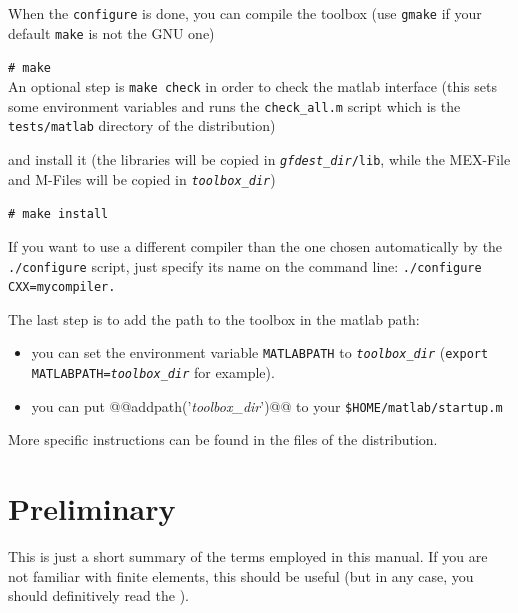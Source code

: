 When the \texttt{configure} is done, you can compile the toolbox (use \texttt{gmake} if your default
\texttt{make} is not the GNU one)

\verb+# make+\\[1mm]

An optional step is \texttt{make check} in order to check the matlab interface (this sets some environment variables and runs the \texttt{check_all.m} script which is the \texttt{tests/matlab} directory of the distribution)

and install it (the libraries will be copied in \texttt{\textit{gfdest_dir}/lib}, while the MEX-File and M-Files 
will be copied in \texttt{\textit{toolbox_dir}})

\verb+# make install+


If you want to use a different compiler than the one chosen
automatically by the \texttt{./configure} script, just specify its
name on the command line: \texttt{./configure CXX=mycompiler.}




The last step is to add the path to the toolbox in the matlab path: 
\begin{itemize}
\item you can set the environment variable \texttt{MATLABPATH} to \texttt{\textit{toolbox_dir}} (\texttt{export MATLABPATH=\textit{toolbox_dir}} for example).
\item you can put @@addpath('\textit{toolbox_dir}')@@ to your \texttt{\$HOME/matlab/startup.m}
\end{itemize}



More specific instructions can be found in the  files of
the distribution.




\section{Preliminary}

This is just a short summary of the terms employed in this manual. If
you are not familiar with finite elements, this should be useful (but
in any case, you should definitively read the
).

